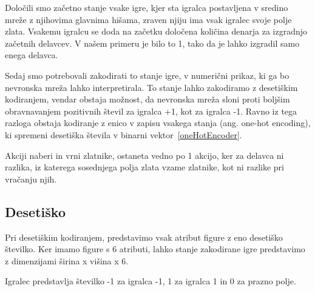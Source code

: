 \documentclass[a4paper, 12pt]{book}
\begin{document}
Določili smo začetno stanje vsake igre, kjer sta igralca postavljena v sredino mreže z njihovima glavnima hišama, zraven njiju ima vsak igralec svoje polje zlata. 
Vsakemu igralcu se doda na začetku določena količina denarja za izgradnjo začetnih delavcev. V našem primeru je bilo to 1, tako da je lahko izgradil samo enega delavca.

Sedaj smo potrebovali zakodirati to stanje igre, v numerični prikaz, ki ga bo nevronska mreža lahko interpretirala. 
To stanje lahko zakodiramo z desetiškim kodiranjem, vendar obstaja možnost, da nevronska mreža sloni proti boljšim obravnavanjem pozitivnih števil za igralca +1, kot za igralca -1. 
Ravno iz tega razloga obstaja kodiranje z enico v zapisu vsakega stanja (ang. one-hot encoding), ki spremeni desetiška števila v binarni vektor~\ref{oneHotEncoder}.

Akciji naberi in vrni zlatnike, ostaneta vedno po 1 akcijo, ker za delavca ni razlika, iz katerega sosednjega polja zlata vzame zlatnike, kot ni razlike pri vračanju njih.

\subsection{Desetiško}
Pri desetiškim kodiranjem, predstavimo vsak atribut figure z eno desetiško številko.
Ker imamo figure s 6 atributi, lahko stanje zakodirane igre predstavimo z dimenzijami širina x višina x 6.

Igralec predstavlja številko -1 za igralca -1, 1 za igralca 1 in 0 za prazno polje.
\end{document}
